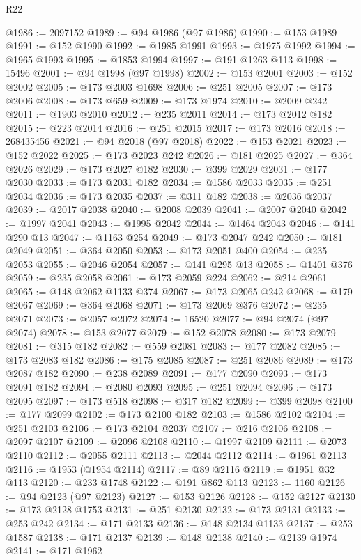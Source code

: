 \begin{lexlean}{R22}
\begin{coremodule}
@1986 := 2097152
@1989 := @94 @1986 (@97 @1986)
@1990 := @153 @1989
@1991 := @152 @1990
@1992 := @1985 @1991
@1993 := @1975 @1992
@1994 := @1965 @1993
@1995 := @1853 @1994
@1997 := @191 @1263 @113
@1998 := 15496
@2001 := @94 @1998 (@97 @1998)
@2002 := @153 @2001
@2003 := @152 @2002
@2005 := @173 @2003 @1698
@2006 := @251 @2005
@2007 := @173 @2006
@2008 := @173 @659
@2009 := @173 @1974
@2010 := @2009 @242
@2011 := @1903 @2010
@2012 := @235 @2011
@2014 := @173 @2012 @182
@2015 := @223 @2014
@2016 := @251 @2015
@2017 := @173 @2016
@2018 := 268435456
@2021 := @94 @2018 (@97 @2018)
@2022 := @153 @2021
@2023 := @152 @2022
@2025 := @173 @2023 @242
@2026 := @181 @2025
@2027 := @364 @2026
@2029 := @173 @2027 @182
@2030 := @399 @2029
@2031 := @177 @2030
@2033 := @173 @2031 @182
@2034 := @1586 @2033
@2035 := @251 @2034
@2036 := @173 @2035
@2037 := @311 @182
@2038 := @2036 @2037
@2039 := @2017 @2038
@2040 := @2008 @2039
@2041 := @2007 @2040
@2042 := @1997 @2041
@2043 := @1995 @2042
@2044 := @1464 @2043
@2046 := @141 @290 @13
@2047 := @1163 @254
@2049 := @173 @2047 @242
@2050 := @181 @2049
@2051 := @364 @2050
@2053 := @173 @2051 @400
@2054 := @235 @2053
@2055 := @2046 @2054
@2057 := @141 @295 @13
@2058 := @1401 @376
@2059 := @235 @2058
@2061 := @173 @2059 @224
@2062 := @214 @2061
@2065 := @148 @2062 @1133 @374
@2067 := @173 @2065 @242
@2068 := @179 @2067
@2069 := @364 @2068
@2071 := @173 @2069 @376
@2072 := @235 @2071
@2073 := @2057 @2072
@2074 := 16520
@2077 := @94 @2074 (@97 @2074)
@2078 := @153 @2077
@2079 := @152 @2078
@2080 := @173 @2079
@2081 := @315 @182
@2082 := @559 @2081
@2083 := @177 @2082
@2085 := @173 @2083 @182
@2086 := @175 @2085
@2087 := @251 @2086
@2089 := @173 @2087 @182
@2090 := @238 @2089
@2091 := @177 @2090
@2093 := @173 @2091 @182
@2094 := @2080 @2093
@2095 := @251 @2094
@2096 := @173 @2095
@2097 := @173 @518
@2098 := @317 @182
@2099 := @399 @2098
@2100 := @177 @2099
@2102 := @173 @2100 @182
@2103 := @1586 @2102
@2104 := @251 @2103
@2106 := @173 @2104 @2037
@2107 := @216 @2106
@2108 := @2097 @2107
@2109 := @2096 @2108
@2110 := @1997 @2109
@2111 := @2073 @2110
@2112 := @2055 @2111
@2113 := @2044 @2112
@2114 := @1961 @2113
@2116 := @1953 (@1954 @2114)
@2117 := @89 @2116
@2119 := @1951 @32 @113
@2120 := @233 @1748
@2122 := @191 @862 @113
@2123 := 1160
@2126 := @94 @2123 (@97 @2123)
@2127 := @153 @2126
@2128 := @152 @2127
@2130 := @173 @2128 @1753
@2131 := @251 @2130
@2132 := @173 @2131
@2133 := @253 @242
@2134 := @171 @2133
@2136 := @148 @2134 @1133
@2137 := @253 @1587
@2138 := @171 @2137
@2139 := @148 @2138
@2140 := @2139 @1974
@2141 := @171 @1962

\end{coremodule}
\end{lexlean}
